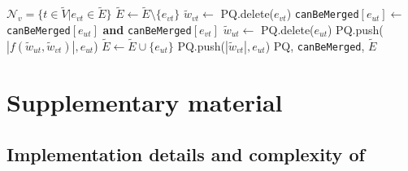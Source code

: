 \begin{algorithm*}
\begin{algorithmic}[1]
      \State $\mathcal{N}_v = \{ t \in \tilde{V} | e_{vt}\in \tilde{E}  \}$ 
       
        \State $\tilde{E} \gets \tilde{E} \setminus \{e_{vt}\}$
        \State $\tilde{w}_{vt} \gets$ PQ.delete($e_{vt}$) 
        \State \texttt{canBeMerged}$[e_{ut}] \gets$ \texttt{canBeMerged}$[e_{ut}]$ \textbf{and} \texttt{canBeMerged}$[e_{vt}]$
          \State $\tilde{w}_{ut} \gets$ PQ.delete($e_{ut}$)  
          \State PQ.push($ |f(\tilde{w}_{ut}, \tilde{w}_{vt})|, e_{ut}$) 
        \Else
          \State $\tilde{E} \gets \tilde{E} \cup \{e_{ut}\}$
          \State PQ.push($ |\tilde{w}_{vt}|, e_{ut}$) 
        \EndIf
      \EndFor
      \State
      \Return PQ, \texttt{canBeMerged}, $\tilde{E}$
    \EndFunction
  \end{algorithmic}
  \label{detailed_alg}
\end{algorithm*}

\section{Supplementary material}

\subsection{Implementation details and complexity of \algname{}} \label{sec:detailed_impl}

